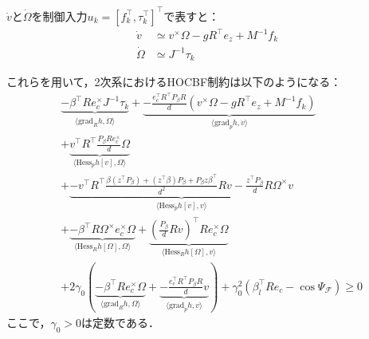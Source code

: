 $\dot{v}$と$\dot{\Omega}$を制御入力$u_k = [f_k^\top, \tau_k^\top]^\top$で表すと：
\begin{equation}
\begin{aligned}
\dot{v} &\simeq v^\times \Omega - g R^\top e_z + M^{-1} f_k \\
\dot{\Omega} &\simeq J^{-1} \tau_k
\label{eq:acceleration}
\end{aligned}
\end{equation}

これらを用いて，2次系におけるHOCBF制約は以下のようになる：
\begin{equation}
\begin{aligned}
&\underbrace{-\beta^\top R e_c^\times J^{-1} \tau_k}_{\langle \mathrm{grad}_R h, \dot{\Omega} \rangle} + \underbrace{-\frac{e_c^\top R^\top P_\beta R}{d} (v^\times \Omega - g R^\top e_z + M^{-1} f_k)}_{\langle \mathrm{grad}_p h, \dot{v} \rangle} \\
&+ \underbrace{v^\top R^\top \frac{P_\beta R e_c^\times}{d} \Omega}_{\langle \mathrm{Hess}_p h[v], \Omega \rangle} \\
&+ \underbrace{-v^\top R^\top \frac{\beta (z^\top P_\beta) + (z^\top \beta) P_\beta + P_\beta z \beta^\top}{d^2} R v - \frac{z^\top P_\beta}{d} R \Omega^\times v}_{\langle \mathrm{Hess}_p h[v], v \rangle} \\
&+ \underbrace{-\beta^\top R \Omega^\times e_c^\times \Omega}_{\langle \mathrm{Hess}_R h[\Omega], \Omega \rangle} + \underbrace{\left(\frac{P_\beta}{d} R v\right)^\top R e_c^\times \Omega}_{\langle \mathrm{Hess}_R h[\Omega], v \rangle} \\
&+ 2\gamma_0 \left(\underbrace{-\beta^\top R e_c^\times \Omega}_{\langle \mathrm{grad}_R h, \Omega \rangle} + \underbrace{-\frac{e_c^\top R^\top P_\beta R}{d} v}_{\langle \mathrm{grad}_p h, v \rangle}\right) + \gamma_0^2 (\beta_l^\top R e_c - \cos\Psi_{\mathcal{F}}) \geq 0
\label{eq:single_hocbf_constraint}
\end{aligned}
\end{equation}
ここで，$\gamma_0 > 0$は定数である．

